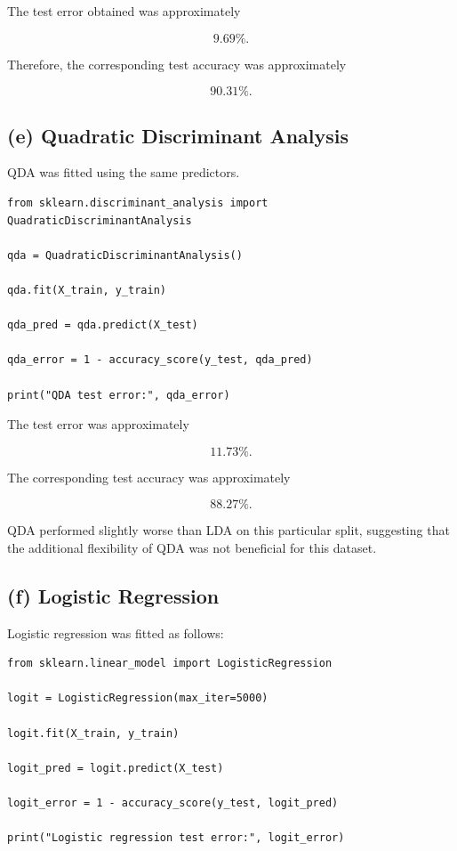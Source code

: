 \documentclass[12pt,a4paper]{article}
\begin{document}
The test error obtained was approximately

\[
\boxed{9.69\%}.
\]

Therefore, the corresponding test accuracy was approximately

\[
\boxed{90.31\%}.
\]

\subsection{(e) Quadratic Discriminant Analysis}

QDA was fitted using the same predictors.

\begin{lstlisting}
from sklearn.discriminant_analysis import QuadraticDiscriminantAnalysis

qda = QuadraticDiscriminantAnalysis()

qda.fit(X_train, y_train)

qda_pred = qda.predict(X_test)

qda_error = 1 - accuracy_score(y_test, qda_pred)

print("QDA test error:", qda_error)
\end{lstlisting}

The test error was approximately

\[
\boxed{11.73\%}.
\]

The corresponding test accuracy was approximately

\[
\boxed{88.27\%}.
\]

QDA performed slightly worse than LDA on this particular split, suggesting
that the additional flexibility of QDA was not beneficial for this dataset.

\subsection{(f) Logistic Regression}

Logistic regression was fitted as follows:

\begin{lstlisting}
from sklearn.linear_model import LogisticRegression

logit = LogisticRegression(max_iter=5000)

logit.fit(X_train, y_train)

logit_pred = logit.predict(X_test)

logit_error = 1 - accuracy_score(y_test, logit_pred)

print("Logistic regression test error:", logit_error)
\end{lstlisting}
\end{document}
